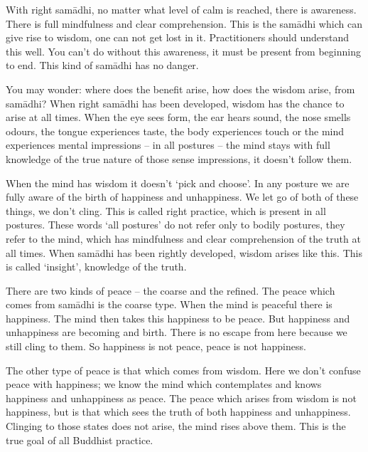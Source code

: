 With right sam\=adhi, no matter what level of calm is reached, there is awareness. There is full mindfulness and clear comprehension. This is the sam\=adhi which can give rise to wisdom, one can not get lost in it. Practitioners should understand this well. You can't do without this awareness, it must be present from beginning to end. This kind of sam\=adhi has no danger.

You may wonder: where does the benefit arise, how does the wisdom arise, from sam\=adhi? When right sam\=adhi has been developed, wisdom has the chance to arise at all times. When the eye sees form, the ear hears sound, the nose smells odours, the tongue experiences taste, the body experiences touch or the mind experiences mental impressions -- in all postures -- the mind stays with full knowledge of the true nature of those sense impressions, it doesn't follow them.

When the mind has wisdom it doesn't `pick and choose'. In any posture we are fully aware of the birth of happiness and unhappiness. We let go of both of these things, we don't cling. This is called right practice, which is present in all postures. These words `all postures' do not refer only to bodily postures, they refer to the mind, which has mindfulness and clear comprehension of the truth at all times. When sam\=adhi has been rightly developed, wisdom arises like this. This is called `insight', knowledge of the truth.

There are two kinds of peace -- the coarse and the refined. The peace which comes from sam\=adhi is the coarse type. When the mind is peaceful there is happiness. The mind then takes this happiness to be peace. But happiness and unhappiness are becoming and birth. There is no escape from  here because we still cling to them. So happiness is not peace, peace is not happiness.

The other type of peace is that which comes from wisdom. Here we don't confuse peace with happiness; we know the mind which contemplates and knows happiness and unhappiness as peace. The peace which arises from wisdom is not happiness, but is that which sees the truth of both happiness and unhappiness. Clinging to those states does not arise, the mind rises above them. This is the true goal of all Buddhist practice.
